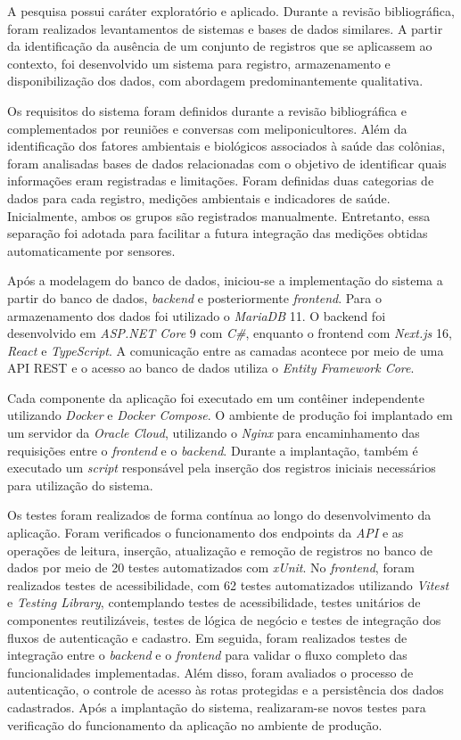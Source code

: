 \documentclass[12pt]{unisenaiclass}
\begin{document}
A pesquisa possui caráter exploratório e aplicado. Durante a revisão bibliográfica, foram realizados levantamentos de sistemas e bases de dados similares. A partir da identificação da ausência de um conjunto de registros que se aplicassem ao contexto, foi desenvolvido um sistema para registro, armazenamento e disponibilização dos dados, com abordagem predominantemente qualitativa.

Os requisitos do sistema foram definidos durante a revisão bibliográfica e complementados por reuniões e conversas com meliponicultores. Além da identificação dos fatores ambientais e biológicos associados à saúde das colônias, foram analisadas bases de dados relacionadas com o objetivo de identificar quais informações eram registradas e limitações. Foram definidas duas categorias de dados para cada registro, medições ambientais e indicadores de saúde. Inicialmente, ambos os grupos são registrados manualmente. Entretanto, essa separação foi adotada para facilitar a futura integração das medições obtidas automaticamente por sensores.

Após a modelagem do banco de dados, iniciou-se a implementação do sistema a partir do banco de dados, \textit{backend} e posteriormente \textit{frontend}. Para o armazenamento dos dados foi utilizado o \textit{MariaDB} 11. O backend foi desenvolvido em \textit{ASP.NET Core} 9 com\textit{ C\#}, enquanto o frontend com \textit{Next.js} 16, \textit{React} e \textit{TypeScript}. A comunicação entre as camadas acontece por meio de uma API REST e o acesso ao banco de dados utiliza o \textit{Entity Framework Core}.

Cada componente da aplicação foi executado em um contêiner independente utilizando \textit{Docker} e \textit{Docker Compose}. O ambiente de produção foi implantado em um servidor da \textit{Oracle Cloud}, utilizando o \textit{Nginx} para encaminhamento das requisições entre o \textit{frontend} e o \textit{backend}. Durante a implantação, também é executado um \textit{script} responsável pela inserção dos registros iniciais necessários para utilização do sistema.

Os testes foram realizados de forma contínua ao longo do desenvolvimento da aplicação. Foram verificados o funcionamento dos endpoints da \textit{API} e as operações de leitura, inserção, atualização e remoção de registros no banco de dados por meio de 20 testes automatizados com \textit{xUnit}. No \textit{frontend}, foram realizados testes de acessibilidade, com 62 testes automatizados utilizando \textit{Vitest} e \textit{Testing Library}, contemplando testes de acessibilidade, testes unitários de componentes reutilizáveis, testes de lógica de negócio e testes de integração dos fluxos de autenticação e cadastro. Em seguida, foram realizados testes de integração entre o \textit{backend} e o \textit{frontend} para validar o fluxo completo das funcionalidades implementadas. Além disso, foram avaliados o processo de autenticação, o controle de acesso às rotas protegidas e a persistência dos dados cadastrados. Após a implantação do sistema, realizaram-se novos testes para verificação do funcionamento da aplicação no ambiente de produção.
\end{document}
